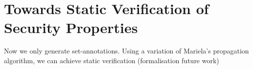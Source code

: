 \section{Towards Static Verification of Security Properties}\label{SecTowardsStaticVer}
 
Now we only generate set-annotations.
Using a variation of Mariela's propagation algorithm, we can achieve static verification (formalisation future work)

